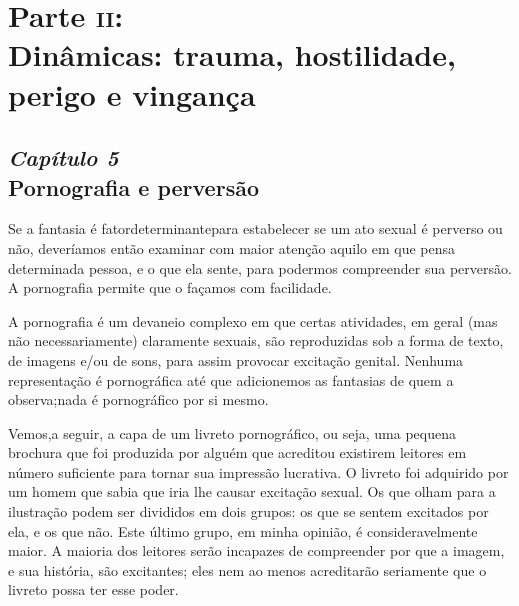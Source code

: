 \part[Parte \textsc{ii}: Dinâmicas: trauma, hostilidade, perigo e vingança]{Parte \textsc{ii}:\\ Dinâmicas: trauma, hostilidade, perigo e vingança}


\chapter[\textbf{5}\quad Pornografia e perversão]{{\large\textit{Capítulo 5}}\\ Pornografia e perversão}


Se a fantasia\idxfantaporn{} é fator\idxporno[|(] determinante\idxvinga[|(] para estabelecer se um ato sexual é
perverso ou não, deveríamos então examinar com maior atenção aquilo em
que pensa determinada pessoa, e o que ela sente, para podermos
compreender sua perversão. A pornografia permite que o façamos com
facilidade.

A pornografia\idxpornofant{} é um devaneio complexo em que certas atividades, em
geral (mas não necessariamente) claramente sexuais, são reproduzidas
sob a forma de texto, de imagens e/ou de sons, para assim provocar
excitação genital. Nenhuma representação é pornográfica até que
adicionemos as fantasias de quem a observa;\idxpornoplat[|(] nada é pornográfico por si
mesmo.

Vemos,\idxtravemporn[|(] a seguir, a capa de um livreto pornográfico, ou seja, uma pequena
brochura que foi produzida por alguém que acreditou existirem leitores
em número suficiente para tornar sua impressão lucrativa. O livreto foi
adquirido por um homem que sabia que iria lhe causar excitação sexual.
Os que olham para a ilustração podem ser divididos em dois grupos: os
que se sentem excitados por ela, e os que não. Este último grupo, em
minha opinião, é consideravelmente maior. A maioria dos leitores serão
incapazes de compreender por que a imagem, e sua história, são
excitantes; eles nem ao menos acreditarão seriamente que o livreto
possa ter esse poder.



